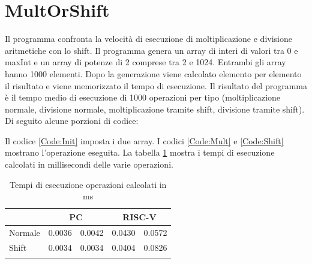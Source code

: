 \documentclass[12pt,a4paper]{report}
\begin{document}
\section{MultOrShift}
Il programma confronta la velocità di esecuzione di moltiplicazione e divisione aritmetiche con lo shift. Il programma genera un array di interi di valori tra 0 e maxInt e un array di potenze di 2 comprese tra 2 e 1024. Entrambi gli array hanno 1000 elementi. Dopo la generazione viene calcolato elemento per elemento il risultato e viene memorizzato il tempo di esecuzione. Il risultato del programma è il tempo medio di esecuzione di 1000 operazioni per tipo (moltiplicazione normale, divisione normale, moltiplicazione tramite shift, divisione tramite shift). Di seguito alcune porzioni di codice:





Il codice \ref{Code:Init} imposta i due array.  I codici \ref{Code:Mult} e \ref{Code:Shift} mostrano l'operazione eseguita.
La tabella \ref{Tab:tempi_esecuzioneMS} mostra i tempi di esecuzione calcolati in millisecondi delle varie operazioni.

\begin{table}[h]
\centering
\begin{tabular}{lcccc}
\cline{2-5}
\multicolumn{1}{l|}{}         & \multicolumn{2}{c|}{PC}                                   & \multicolumn{2}{c|}{RISC-V}                               \\ \hline
\multicolumn{1}{|l|}{Normale} & \multicolumn{1}{c|}{0.0036} & \multicolumn{1}{c|}{0.0042} & \multicolumn{1}{c|}{0.0430} & \multicolumn{1}{c|}{0.0572} \\ \hline
\multicolumn{1}{|l|}{Shift}   & \multicolumn{1}{c|}{0.0034} & \multicolumn{1}{c|}{0.0034} & \multicolumn{1}{c|}{0.0404} & \multicolumn{1}{c|}{0.0826} \\ \hline
                              & \multicolumn{1}{l}{}        & \multicolumn{1}{l}{}        & \multicolumn{1}{l}{}        & \multicolumn{1}{l}{}       
\end{tabular}
	\label{Tab:tempi_esecuzioneMS}
	\caption{Tempi di esecuzione operazioni calcolati in ms}
\end{table}
	
\end{document}
